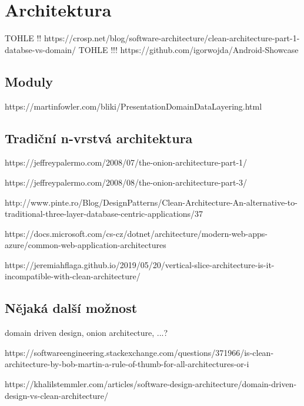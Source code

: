 \section{Architektura}

TOHLE !! https://crosp.net/blog/software-architecture/clean-architecture-part-1-databse-vs-domain/
TOHLE !!! https://github.com/igorwojda/Android-Showcase

\subsection{Moduly}


https://martinfowler.com/bliki/PresentationDomainDataLayering.html

\subsection{Tradiční n-vrstvá architektura}

https://jeffreypalermo.com/2008/07/the-onion-architecture-part-1/

https://jeffreypalermo.com/2008/08/the-onion-architecture-part-3/

http://www.pinte.ro/Blog/DesignPatterns/Clean-Architecture-An-alternative-to-traditional-three-layer-database-centric-applications/37

https://docs.microsoft.com/cs-cz/dotnet/architecture/modern-web-apps-azure/common-web-application-architectures

https://jeremiahflaga.github.io/2019/05/20/vertical-slice-architecture-is-it-incompatible-with-clean-architecture/

\subsection{Nějaká další možnost}

domain driven design, onion architecture, ...? 


https://softwareengineering.stackexchange.com/questions/371966/is-clean-architecture-by-bob-martin-a-rule-of-thumb-for-all-architectures-or-i

https://khalilstemmler.com/articles/software-design-architecture/domain-driven-design-vs-clean-architecture/

